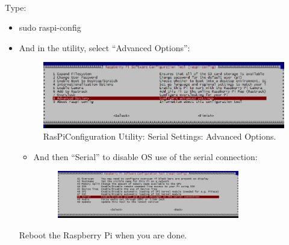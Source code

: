 \documentclass[11pt,a4paper]{article}
\begin{document}
		\paragraph{}Type:
			\begin{itemize}
				\item sudo raspi-config
				\item And in the utility, select 								“Advanced Options”:
				\begin{figure}[H]
	 	\centering
		\includegraphics[scale=0.37]{adv1}
	 	\caption{RasPiConfiguration Utility: Serial Settings: Advanced Options.}
\end{figure}
		\begin{itemize}
			\item And then “Serial” to disable OS use of the serial connection:
			\begin{figure}[H]
	 	\centering
		\includegraphics[scale=0.85]{adv2}
\end{figure}
		\end{itemize}
Reboot the Raspberry Pi when you are done.
			\end{itemize}
\end{document}
